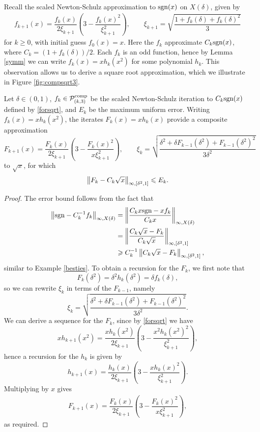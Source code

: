 Recall the scaled Newton-Schulz approximation to $\text{sgn}(x)$ on $X(\delta)$, given by
\begin{align}
    f_{k+1}(x)=\dfrac{f_k(x)}{2\xi_{k+1}}\left(3-\dfrac{f_k(x)^2}{\xi_{k+1}^2}\right), \qquad \xi_{k+1} = \sqrt{\dfrac{1+f_{k}(\delta)+f_{k}(\delta)^2}{3}}\label{forsqrt}
\end{align}
for $k\geq 0$, with initial guess $f_0(x)=x$. Here the $f_k$ approximate $C_k \text{sgn}(x)$, where $C_k=(1+f_k(\delta))/2$. Each $f_k$ is an odd function, hence by Lemma \ref{symm} we can write $f_k(x)=xh_k(x^2)$ for some polynomial $h_k$. This observation allows us to derive a square root approximation, which we illustrate in Figure \ref{fig:compsqrt3}.

\begin{thm}
Let $\delta \in (0,1)$, $f_k \in \mathcal{P}_{(k,3)}^{\text{comp}}$ be the scaled Newton-Schulz iteration to $C_k \text{sgn} (x)$ defined by \eqref{forsqrt}, and $E_k$ be the maximum uniform error. Writing $f_k(x)=xh_k(x^2)$, the iterates $F_k(x)=xh_k(x)$ provide a composite approximation 
\[F_{k+1}(x) = \dfrac{F_k(x)}{2\xi_{k+1}}\left(3-\dfrac{F_k(x)^2}{x\xi_{k+1}^2}\right), \qquad \xi_k = \sqrt{\dfrac{\delta^2+\delta F_{k-1}(\delta^2) + F_{k-1}(\delta^2)^2}{3\delta^2}} \]
to $\sqrt{x}$, for which
\[\left\lVert F_k - C_k\sqrt{x}\right\rVert_{\infty,[\delta^2,1]} \leqslant E_k.\]
\end{thm}

\begin{proof}
The error bound follows from the fact that
\begin{align*}
    \left\lVert\text{sgn}-C_k^{-1}f_k\right\rVert_{\infty,X(\delta)}&= \left\lVert\dfrac{C_k x\text{sgn}-xf_k}{C_k x}\right\rVert_{\infty,X(\delta)}\\
    &=\left\lVert\dfrac{C_k\sqrt{x}-F_k}{C_k\sqrt{x}}\right\rVert_{\infty,[\delta^2,1]}\\
    & \geqslant C_k^{-1} \left\lVert C_k\sqrt{x}-F_k\right\rVert_{\infty,[\delta^2,1]},
\end{align*}
similar to Example \ref{besties}. To obtain a recursion for the $F_k$, we first note that
\[F_k(\delta^2)=\delta^2 h_k(\delta^2) = \delta f_k(\delta),\]
so we can rewrite $\xi_k$ in terms of the $F_{k-1}$, namely
\[\xi_k = \sqrt{\dfrac{\delta^2+\delta F_{k-1}(\delta^2) + F_{k-1}(\delta^2)^2}{3\delta^2}}.\]
We can derive a sequence for the $F_k$, since by \eqref{forsqrt} we have
\[xh_{k+1}(x^2)=\dfrac{xh_k(x^2)}{2\xi_{k+1}}\left(3-\dfrac{x^2h_k(x^2)^2}{\xi_{k+1}^2}\right),\]
hence a recursion for the $h_k$ is given by
\[h_{k+1}(x) = \dfrac{h_k(x)}{2\xi_{k+1}}\left(3-\dfrac{xh_k(x)^2}{\xi_{k+1}^2}\right).\]
Multiplying by $x$ gives
\begin{align}
    F_{k+1}(x) = \dfrac{F_k(x)}{2\xi_{k+1}}\left(3-\dfrac{F_k(x)^2}{x\xi_{k+1}^2}\right), \label{comprelsqrt}
\end{align}
as required.
\end{proof}

